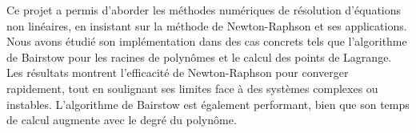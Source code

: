 Ce projet a permis d'aborder les méthodes numériques de résolution d'équations non linéaires, en insistant
 sur la méthode de Newton-Raphson et ses applications. \\
 Nous avons étudié son implémentation dans des cas concrets tels que l'algorithme de Bairstow pour les racines de polynômes 
 et le calcul des points de Lagrange. \\
 Les résultats montrent l'efficacité de Newton-Raphson pour converger rapidement, tout en 
 soulignant ses limites face à des systèmes complexes ou instables. L'algorithme de Bairstow est 
 également performant, bien que son temps de calcul augmente avec le degré du polynôme. 